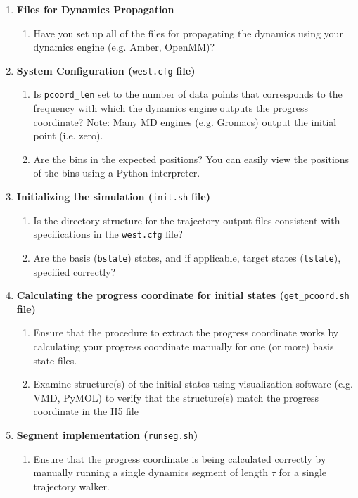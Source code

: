 \renewcommand{\labelenumi}{}
\renewcommand{\labelenumii}{$\square$}
\begin{enumerate}
\item \textbf{Files for Dynamics Propagation}
\begin{enumerate}
\item Have you set up all of the files for propagating the dynamics using your dynamics engine (e.g. Amber, OpenMM)? 
\end{enumerate}
\item \textbf{System Configuration (}\verb|west.cfg| \textbf{file)}
\begin{enumerate}
\item Is \verb|pcoord_len| set to the number of data points that corresponds to the frequency with which the dynamics engine outputs the progress coordinate? Note: Many MD engines (e.g. Gromacs) output the initial point (i.e. zero). 
\item Are the bins in the expected positions? You can easily view the positions of the bins using a Python interpreter.
\end{enumerate}
\item \textbf{Initializing the simulation (}\verb|init.sh| \textbf{file)} 
\begin{enumerate}
\item Is the directory structure for the trajectory output files consistent with specifications in the \verb|west.cfg| file? 
\item Are the basis (\verb|bstate|) states, and if applicable, target states (\verb|tstate|), specified correctly?
\end{enumerate}
\item \textbf{Calculating the progress coordinate for initial states (}\verb|get_pcoord.sh| \textbf{file)}
\begin{enumerate}
\item Ensure that the procedure to extract the progress coordinate works by calculating your progress coordinate manually for one (or more) basis state files. 
\item Examine structure(s) of the initial states using visualization software (e.g. VMD, PyMOL) to verify that the structure(s) match the progress coordinate in the H5 file 
\end{enumerate}
\item \textbf{Segment implementation (}\verb|runseg.sh|\textbf{)}
\begin{enumerate}
\item Ensure that the progress coordinate is being calculated correctly by manually running a single dynamics segment of length $\tau$ for a single trajectory walker. 

\end{enumerate}
\end{enumerate}

